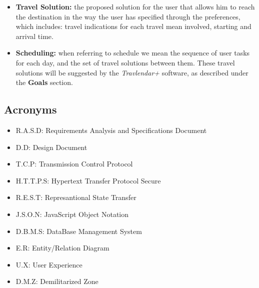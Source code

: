 \begin{itemize}
    \item \textbf{Travel Solution:} the proposed solution for the user that allows him to reach the destination in the way the user has specified through the preferences, which includes: travel indications for each travel mean involved, starting and arrival time.

    \item \textbf{Scheduling:} when referring to schedule we mean the sequence of user tasks for each day, and the set of travel solutions between them. These travel solutions will be suggested by the \emph{Travlendar+} software, as described under the \textbf{Goals} section.
    
\end{itemize}

\subsection{Acronyms}
\begin{itemize}
    \item R.A.S.D: Requirements Analysis and Specifications Document
    \item D.D: Design Document
    \item T.C.P: Transmission Control Protocol
    \item H.T.T.P.S: Hypertext Transfer Protocol Secure
    \item R.E.S.T: Represantional State Transfer
    \item J.S.O.N: JavaScript Object Notation
    \item D.B.M.S: DataBase Management System
    \item E.R: Entity/Relation Diagram
    \item U.X: User Experience
    \item D.M.Z: Demilitarized Zone
\end{itemize}